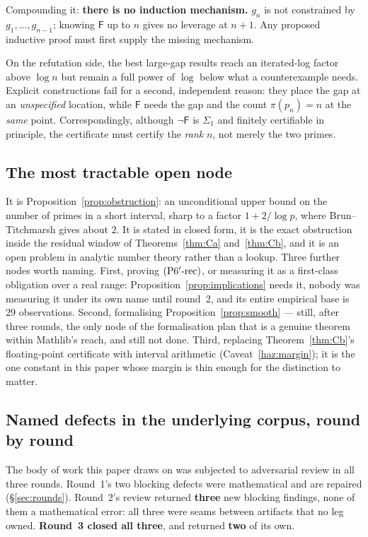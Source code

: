 \documentclass[11pt,a4paper]{article}
\theoremstyle{plain}
\theoremstyle{definition}
\theoremstyle{remark}
\newcommand{\Fb}{\mathsf{F}}
\newcommand{\Prec}{\textup{(P6$'$-rec)}}
\begin{document}
Compounding it: \textbf{there is no induction mechanism.} $g_n$ is not constrained by
$g_1,\dots,g_{n-1}$; knowing $\Fb$ up to $n$ gives no leverage at $n+1$. Any proposed
inductive proof must first supply the missing mechanism.

On the refutation side, the best large-gap results \cite{ford2016large} reach an iterated-log
factor above $\log n$ but remain a full power of $\log$ below what a counterexample needs.
Explicit constructions fail for a second, independent reason: they place the gap at an
\emph{unspecified} location, while $\Fb$ needs the gap and the count $\pi(p_n) = n$ at the
\emph{same} point. Correspondingly, although $\neg\Fb$ is $\Sigma_1$ and finitely certifiable
in principle, the certificate must certify the \emph{rank} $n$, not merely the two primes.

\subsection{The most tractable open node}

It is Proposition~\ref{prop:obstruction}: an unconditional upper bound on the number of primes
in a short interval, sharp to a factor $1 + 2/\log p$, where Brun--Titchmarsh gives about $2$.
It is stated in closed form, it is the exact obstruction inside the residual window of
Theorems~\ref{thm:Ca} and~\ref{thm:Cb}, and it is an open problem in analytic number theory
rather than a lookup. Three further nodes worth naming. First, proving $\Prec$, or measuring it
as a first-class obligation over a real range: Proposition~\ref{prop:implications} needs it,
nobody was measuring it under its own name until round~2, and its entire empirical base is $29$
observations. Second, formalising Proposition~\ref{prop:smooth} --- still, after three rounds,
the only node of the formalisation plan that is a genuine theorem within Mathlib's reach, and
still not done. Third, replacing Theorem~\ref{thm:Cb}'s floating-point certificate with
interval arithmetic (Caveat~\ref{haz:margin}); it is the one constant in this paper whose
margin is thin enough for the distinction to matter.

\subsection{Named defects in the underlying corpus, round by round}
\label{sec:defects}

The body of work this paper draws on was subjected to adversarial review in all three rounds.
Round~1's two blocking defects were mathematical and are repaired (\S\ref{sec:rounds}).
Round~2's review returned \textbf{three} new blocking findings, none of them a mathematical
error: all three were seams between artifacts that no leg owned. \textbf{Round~3 closed all
three}, and returned \textbf{two} of its own.
\end{document}
